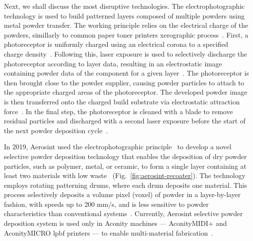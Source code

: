Next, we shall discuss the most disruptive technologies.
The electrophotographic technology is used to build patterned layers
composed of multiple powders using metal powder transfer. The working principle
relies on the electrical charge of the powders, simillarly to common paper toner
printers xerographic process~\cite{van2005metal}.
First, a photoreceptor is uniformly charged using an electrical corona to a
specified charge density~\cite{bakkelund1997fabrication}. Following this, laser
exposure is used to selectively discharge the photoreceptor according to layer
data, resulting in an electrostatic image containing powder data of the
component for a given layer~\cite{psarommatis2022systematic,
  stichel2020electrophotographic}. The photoreceptor is then brought close to
the powder supplier, causing powder particles to attach to the appropriate
charged areas of the photoreceptor. The developed powder image is then
transferred onto the charged build substrate via electrostatic attraction
force~\cite{mehrpouya2022multimaterial}. In the final step, the photoreceptor is
cleaned with a blade to remove residual particles and discharged with a second
laser exposure before the start of the next powder deposition
cycle~\cite{benning2018proof}.

In 2019, Aerosint used the electrophotographic principle~\cite{wang2022recent} to develop a novel selective powder deposition technology that
enables the deposition of dry powder particles, such as polymer, metal, or
ceramic, to form a single layer containing at least two materials with low
waste~\cite{aerosintPatternDrum2019} (Fig.~\ref{fig:aerosint-recoater}). The technology employs rotating patterning drums, where each drum
deposits one material. This process selectively deposits a volume pixel (voxel)
of powder in a layer-by-layer fashion, with speeds up to 200 mm/s, and is less
sensitive to powder characteristics than conventional
systems~\cite{eckes2018multi}. Currently, Aerosint selective powder deposition
system is used only in Aconity machines --- AconityMIDI+ and AconityMICRO
\gls{lpbf} printers --- to enable multi-material fabrication~\cite{aerosintSite}.

